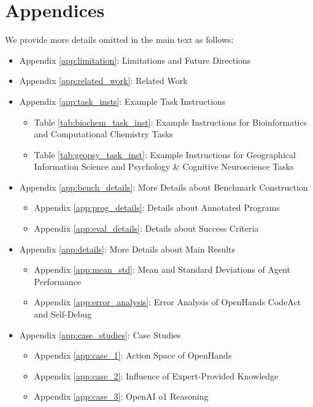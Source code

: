 \section*{Appendices}
We provide more details omitted in the main text as follows:
\begin{itemize}
    \item Appendix \ref{app:limitation}: Limitations and Future Directions \newline
    \item Appendix \ref{app:related_work}: Related Work \newline
    \item Appendix \ref{app:task_insts}: Example Task Instructions
    \begin{itemize}
        \item Table \ref{tab:biochem_task_inst}: Example Instructions for Bioinformatics and Computational Chemistry Tasks
        \item Table \ref{tab:geopsy_task_inst}: Example Instructions for Geographical Information Science and Psychology \& Cognitive Neuroscience Tasks \\
    \end{itemize}

    \item Appendix \ref{app:bench_details}: More Details about Benchmark Construction
    \begin{itemize}
        \item Appendix \ref{app:prog_details}: Details about Annotated Programs
        \item Appendix \ref{app:eval_details}: Details about Success Criteria \\
    \end{itemize}

    \item Appendix \ref{app:details}: More Details about Main Results
    \begin{itemize}
        \item Appendix \ref{app:mean_std}: Mean and Standard Deviations of Agent Performance
        \item Appendix \ref{app:error_analysis}: Error Analysis of OpenHands CodeAct and Self-Debug \\
    \end{itemize}
    
    \item Appendix \ref{app:case_studies}: Case Studies
    \begin{itemize}
        \item Appendix \ref{app:case_1}: Action Space of OpenHands
        \item Appendix \ref{app:case_2}: Influence of Expert-Provided Knowledge 
        \item Appendix \ref{app:case_3}: OpenAI o1 Reasoning \\
    \end{itemize} 
    

\end{itemize}
